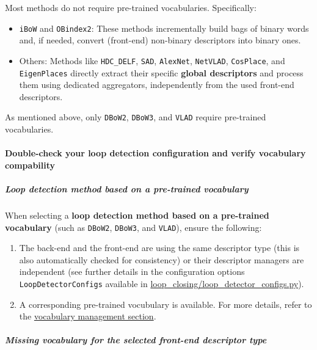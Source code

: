 \documentclass{article}
\let\oldparagraph\paragraph
\renewcommand{\paragraph}[1]{\oldparagraph{#1}\mbox{}}
\let\oldsubparagraph\subparagraph
\renewcommand{\subparagraph}[1]{\oldsubparagraph{#1}\mbox{}}
\begin{document}
Most methods do not require pre-trained vocabularies. Specifically:
\begin{itemize}
\item \texttt{iBoW} and \texttt{OBindex2}: These methods incrementally build
bags of binary words and, if needed, convert (front-end) non-binary
descriptors into binary ones. 
\item Others: Methods like \texttt{HDC\_DELF},
\texttt{SAD}, \texttt{AlexNet}, \texttt{NetVLAD}, \texttt{CosPlace}, and
\texttt{EigenPlaces} directly extract their specific \textbf{global
descriptors} and process them using dedicated aggregators, independently
from the used front-end descriptors.
\end{itemize}

As mentioned above, only \texttt{DBoW2}, \texttt{DBoW3}, and
\texttt{VLAD} require pre-trained vocabularies.

\hypertarget{double-check-your-loop-detection-configuration-and-verify-vocabulary-compability}{%
\paragraph{Double-check your loop detection configuration and verify
vocabulary
compability}\label{double-check-your-loop-detection-configuration-and-verify-vocabulary-compability}}

\hypertarget{loop-detection-method-based-on-a-pre-trained-vocabulary}{%
\subparagraph{Loop detection method based on a pre-trained
vocabulary}\label{loop-detection-method-based-on-a-pre-trained-vocabulary}}

When selecting a \textbf{loop detection method based on a pre-trained
vocabulary} (such as \texttt{DBoW2}, \texttt{DBoW3}, and \texttt{VLAD}),
ensure the following: 
\begin{enumerate}
\item The back-end and the front-end are using the
same descriptor type (this is also automatically checked for
consistency) or their descriptor managers are independent (see further
details in the configuration options \texttt{LoopDetectorConfigs}
available in \url{loop_closing/loop_detector_configs.py}). 
\item A corresponding pre-trained vocubulary is available. For more details,
refer to the \protect\hyperlink{vocabulary-management}{vocabulary
management section}.
\end{enumerate}

\hypertarget{missing-vocabulary-for-the-selected-front-end-descriptor-type}{%
\subparagraph{Missing vocabulary for the selected front-end descriptor
type}\label{missing-vocabulary-for-the-selected-front-end-descriptor-type}}
\end{document}

